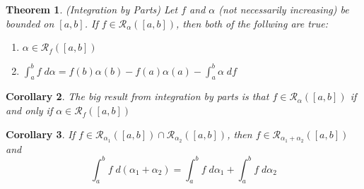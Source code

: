 \documentclass[12pt]{article}
\numberwithin{equation}{section} %
\theoremstyle{plain}
\newtheorem{thm}{Theorem}[section]
\newtheorem{cor}[thm]{Corollary}
\theoremstyle{definition}
\theoremstyle{remark}
\begin{document}
\begin{thm}
\label{thm.intbyparts}
\emph{(Integration by Parts)}
Let $f$ and $\alpha$ (not necessarily increasing) be bounded on $[a,b]$.
If $f\in\mathscr{R}_\alpha([a,b])$, then both of the follwing are true:
\begin{enumerate}[label=\emph{(\roman*)}]
  \item $\alpha\in\mathscr{R}_f([a,b])$
  \item
    $\int^b_a f\;d\alpha = f(b) \alpha(b) - f(a)\alpha(a) - \int^b_a
    \alpha \; df$
\end{enumerate}
\end{thm}
\begin{cor}
The big result from integration by parts is that
$f\in\mathscr{R}_\alpha([a,b])$ if and only if $\alpha\in\mathscr{R}_f([a,b])$
\end{cor}

\begin{cor}
If $f\in\mathscr{R}_{\alpha_1}([a,b]) \cap \mathscr{R}_{\alpha_2}([a,b])$, then $f\in\mathscr{R}_{\alpha_1 + \alpha_2}([a,b])$ and
    \[ \int^b_a f\;d(\alpha_1 + \alpha_2) =
    \int^b_a f\;d\alpha_1 + \int^b_a f\;d\alpha_2 \]
\end{cor}
\end{document}
